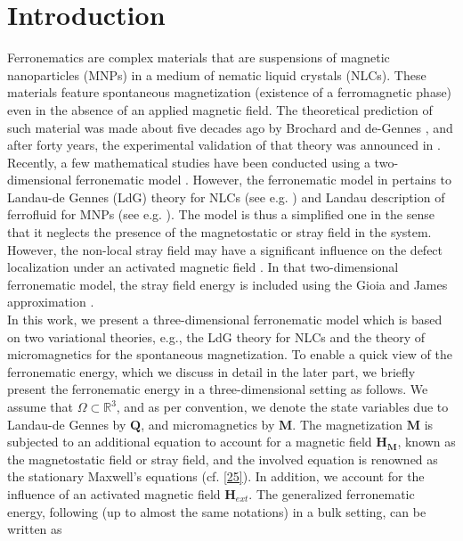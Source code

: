 \documentclass{article}
\def\Qvec{\mathbf{Q}}
\def \Mvec{\mathbf{M}}
\def\Hvec{\mathbf{H}}
\begin{document}
\section{Introduction}
Ferronematics are complex materials that are suspensions of magnetic nanoparticles (MNPs) in a medium of nematic liquid crystals (NLCs). These materials feature spontaneous magnetization (existence of a ferromagnetic phase) even in the absence of an applied magnetic field. The theoretical prediction of such material was made about five decades ago by Brochard and de-Gennes \cite{brochard1970theory}, and after forty years, the experimental validation of that theory was announced in \cite{Mertelj}. Recently, a few mathematical studies \cite{Dalby, maity2021parameter, Canevari, canevari2025formation} have been conducted using a two-dimensional ferronematic model \cite{Bisht2020}.\newline
However, the ferronematic model in \cite{Bisht2020} pertains to Landau-de Gennes (LdG) theory for NLCs (see e.g. \cite{Gennes}) and Landau description of ferrofluid for MNPs (see e.g. \cite{Pleiner}). The model \cite{Bisht2020} is thus a simplified one in the sense that it neglects the presence of the magnetostatic or stray field in the system. However, the non-local stray field may have a significant influence on the defect localization under an activated magnetic field \cite{dutta2025study}. In that two-dimensional ferronematic model, the stray field energy is included using the Gioia and James approximation \cite{Giogia}.\newline\\
In this work, we present a three-dimensional ferronematic model which is based on two variational theories, e.g., the LdG theory for NLCs and the theory of micromagnetics for the spontaneous magnetization. To enable a quick view of the ferronematic energy, which we discuss in detail in the later part, we briefly present the ferronematic energy in a three-dimensional setting as follows. We assume that $\Omega\subset\mathbb R^3$, and as per convention, we denote the state variables due to Landau-de Gennes by $\Qvec$, and micromagnetics by $\Mvec$. The magnetization $\Mvec$ is subjected to an additional equation to account for a magnetic field $\Hvec_{\Mvec}$, known as the magnetostatic field or stray field, and the involved equation is renowned as the stationary Maxwell's equations (cf. \eqref{25}). In addition, we account for the influence of an activated magnetic field $\Hvec_{ext}$. The generalized ferronematic energy, following \cite{dutta2026existence} (up to almost the same notations) in a bulk setting, can be written as
\end{document}
